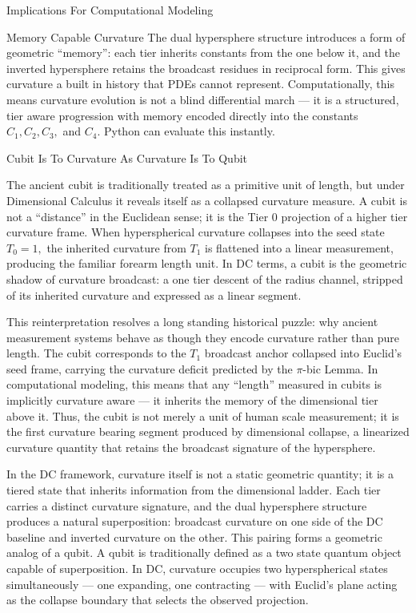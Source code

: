 \documentclass[final,onefignum,onetabnum]{siamart}
\begin{document}
\begin{section}{Implications For Computational Modeling}
\begin{subsection}{Memory Capable Curvature}
The dual hypersphere structure introduces a form of geometric “memory”: each tier inherits constants from the one below it, and the inverted hypersphere retains the broadcast residues in reciprocal form. This gives curvature a built in history that PDEs cannot represent. Computationally, this means curvature evolution is not a blind differential march — it is a structured, tier aware progression with memory encoded directly into the constants $C_1 ,C_2 ,C_3 ,$ and $C_4.$ Python can evaluate this instantly.
\end{subsection}

\begin{subsection}{Cubit Is To Curvature As Curvature Is To Qubit}

The ancient cubit is traditionally treated as a primitive unit of length, but under Dimensional Calculus it reveals itself as a collapsed curvature measure. A cubit is not a “distance” in the Euclidean sense; it is the Tier 0 projection of a higher tier curvature frame. When hyperspherical curvature collapses into the seed state $T_0=1,$ the inherited curvature from $T_1$ is flattened into a linear measurement, producing the familiar forearm length unit. In DC terms, a cubit is the geometric shadow of curvature broadcast: a one tier descent of the radius channel, stripped of its inherited curvature and expressed as a linear segment.

This reinterpretation resolves a long standing historical puzzle: why ancient measurement systems behave as though they encode curvature rather than pure length. The cubit corresponds to the $T_1$ broadcast anchor collapsed into Euclid’s seed frame, carrying the curvature deficit predicted by the $\pi$-bic Lemma. In computational modeling, this means that any “length” measured in cubits is implicitly curvature aware — it inherits the memory of the dimensional tier above it. Thus, the cubit is not merely a unit of human scale measurement; it is the first curvature bearing segment produced by dimensional collapse, a linearized curvature quantity that retains the broadcast signature of the hypersphere.

In the DC framework, curvature itself is not a static geometric quantity; it is a tiered state that inherits information from the dimensional ladder. Each tier carries a distinct curvature signature, and the dual hypersphere structure produces a natural superposition: broadcast curvature on one side of the DC baseline and inverted curvature on the other. This pairing forms a geometric analog of a qubit. A qubit is traditionally defined as a two state quantum object capable of superposition. In DC, curvature occupies two hyperspherical states simultaneously — one expanding, one contracting — with Euclid’s plane acting as the collapse boundary that selects the observed projection.


\end{subsection}
\end{section}
\end{document}
